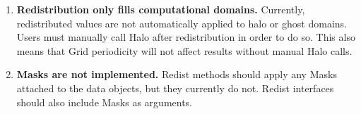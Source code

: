 

\begin{enumerate}

\item {\bf Redistribution only fills computational domains.}  Currently,
redistributed values are not automatically applied to halo or ghost
domains.  Users must manually call Halo after redistribution in order
to do so.  This also means that Grid periodicity will not affect
results without manual Halo calls.

\item {\bf Masks are not implemented.}  Redist methods should apply
any Masks attached to the data objects, but they currently do not.  Redist
interfaces should also include Masks as arguments.

\end{enumerate}


